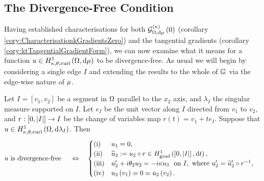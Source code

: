 \subsection{The Divergence-Free Condition} \label{sec:ktDivFree}
Having established characterisations for both $\mathcal{G}_{ \Omega, \mathrm{d}\mu}^{(\kappa)}\left( 0 \right)$ (corollary \ref{cory:CharacterisationkGradientsZero}) and the tangential gradients (corollary \ref{cory:ktTangentialGradientForm}), we can now examine what it means for a function $u\in H^1_{\kappa,\theta,\mathrm{curl}}\left( \Omega, \mathrm{d}\mu \right)$ to be divergence-free.
As usual we will begin by considering a single edge $I$ and extending the results to the whole of $\mathbb{G}$ via the edge-wise nature of $\mu$.
\begin{lemma} \label{lem:DivFreeParallelSegment}
	Let $I=[v_1,v_2]$ be a segment in $\Omega$ parallel to the $x_2$ axis, and $\lambda_I$ the singular measure supported on $I$.
	Let $e_I$ be the unit vector along $I$ directed from $v_1$ to $v_2$, and $r:\left[ 0,\left\lvert I \right\rvert \right]\rightarrow I$ be the change of variables map $r(t) = v_1 + te_I$.
	Suppose that $u\in H^1_{\kappa,\theta,\mathrm{curl}}\left( \Omega, \mathrm{d}\lambda_I \right)$.
	Then
	\begin{align*}
		u \text{ is divergence-free } &\quad\Leftrightarrow\quad
		\begin{cases}
		\mathrm{(i)} & u_1 = 0, \\
		\mathrm{(ii)} & \widetilde{u}_2 := u_2 \circ r \in \gradSob{\interval{I}}{t}, \\
		\mathrm{(iii)} & u_2' + i\qm_2 u_2 = -i\wavenumber u_3 \ \text{ on } I, \text{ where } u_2' = \widetilde{u}_2' \circ r^{-1}, \\
		\mathrm{(iv)} & u_2\bracs{v_1} = 0 = u_2\bracs{v_2}.
		\end{cases}
	\end{align*}
\end{lemma}
